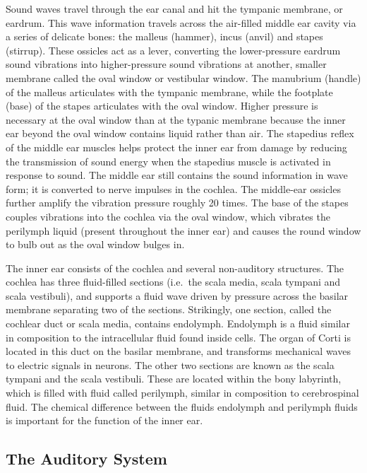 Sound waves travel through the ear canal and hit the tympanic membrane,
or eardrum. This wave information travels across the air-filled middle
ear cavity via a series of delicate bones: the malleus (hammer), incus
(anvil) and stapes (stirrup). These ossicles act as a lever, converting
the lower-pressure eardrum sound vibrations into higher-pressure sound
vibrations at another, smaller membrane called the oval window or
vestibular window. The manubrium (handle) of the malleus articulates
with the tympanic membrane, while the footplate (base) of the stapes
articulates with the oval window. Higher pressure is necessary at the
oval window than at the typanic membrane because the inner ear beyond
the oval window contains liquid rather than air. The stapedius reflex of
the middle ear muscles helps protect the inner ear from damage by
reducing the transmission of sound energy when the stapedius muscle is
activated in response to sound. The middle ear still contains the sound
information in wave form; it is converted to nerve impulses in the
cochlea. The middle-ear ossicles further amplify the vibration pressure
roughly 20 times. The base of the stapes couples vibrations into the
cochlea via the oval window, which vibrates the perilymph liquid
(present throughout the inner ear) and causes the round window to bulb
out as the oval window bulges in.

The inner ear consists of the cochlea and several non-auditory
structures. The cochlea has three fluid-filled sections (i.e.~the scala
media, scala tympani and scala vestibuli), and supports a fluid wave
driven by pressure across the basilar membrane separating two of the
sections. Strikingly, one section, called the cochlear duct or scala
media, contains endolymph. Endolymph is a fluid similar in composition
to the intracellular fluid found inside cells. The organ of Corti is
located in this duct on the basilar membrane, and transforms mechanical
waves to electric signals in neurons. The other two sections are known
as the scala tympani and the scala vestibuli. These are located within
the bony labyrinth, which is filled with fluid called perilymph, similar
in composition to cerebrospinal fluid. The chemical difference between
the fluids endolymph and perilymph fluids is important for the function
of the inner ear.

\hypertarget{the-auditory-system}{%
\subsection{The Auditory System}\label{the-auditory-system}}


